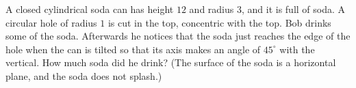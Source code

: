 A closed cylindrical soda can has height $12$ and radius $3$, and it is full of soda. A circular hole of radius $1$ is cut in the top, concentric with the top. Bob drinks some of the soda. Afterwards he notices that the soda just reaches the edge of the hole when the can is tilted so that its axis makes an angle of $45^\circ$ with the vertical. How much soda did he drink? (The surface of the soda is a horizontal plane, and the soda does not splash.)
